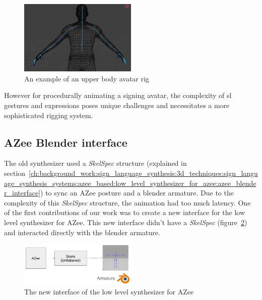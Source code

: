 \documentclass[../../main.tex]{subfiles}
\begin{document}
\begin{figure}[h]
    \centering
    \includegraphics[width=0.5\textwidth]{chapters/avatar_creation_pose_synthesis/images/upper_body_avatar.png}
    \caption{An example of an upper body avatar rig}
    \label{ref:upper_body_avatar}
\end{figure}

However for procedurally animating a signing avatar, the complexity of \gls{sl} gestures and expressions poses unique challenges and necessitates a more sophisticated rigging system.

\subsection{AZee Blender interface}
\label{ch:avatar_creation_pose_synthesis:proc_rig_signing_avatars:azee_blender_interface}

The old synthesizer used a \emph{SkelSpec} structure (explained in section~\ref{ch:background_work:sign_language_synthesis:3d_techniques:sign_language_synthesis_systems:azee_based:low_level_synthesizer_for_azee:azee_blender_interface}) to sync an AZee posture and a blender armature. Due to the complexity of this \emph{SkelSpec} structure, the animation had too much latency. One of the first contributions of our work was to create a new interface for the low level synthesizer for AZee. This new interface didn't have a \emph{SkelSpec} (figure~\ref{fig:new_interface}) and interacted directly with the blender armature. 

\begin{figure}
    \centering
    \includegraphics[width=0.5\textwidth]{chapters/avatar_creation_pose_synthesis/images/new_interface.png}
    \caption{The new interface of the low level synthesizer for AZee}
    \label{fig:new_interface}
\end{figure}
\end{document}
